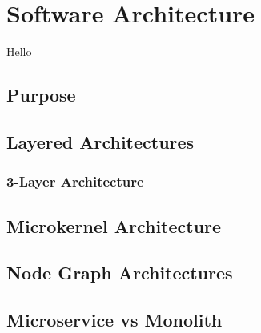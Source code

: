 \chapter{Software Architecture}

Hello

\section{Purpose}

\section{Layered Architectures}
\subsection{3-Layer Architecture}

\section{Microkernel Architecture}

\section{Node Graph Architectures}

\section{Microservice vs Monolith}


